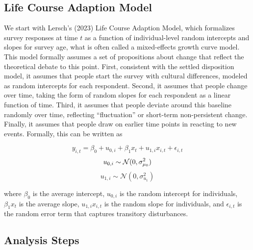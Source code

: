 \documentclass[
  12pt,
]{article}
\begin{document}
\hypertarget{life-course-adaption-model}{%
\subsection{Life Course Adaption
Model}\label{life-course-adaption-model}}

We start with Lersch's (2023) Life Course Adaption Model, which
formalizes survey responses at time \(t\) as a function of
individual-level random intercepts and slopes for survey age, what is
often called a mixed-effects growth curve model. This model formally
assumes a set of propositions about change that reflect the theoretical
debate to this point. First, consistent with the settled disposition
model, it assumes that people start the survey with cultural
differences, modeled as random intercepts for each respondent. Second,
it assumes that people change over time, taking the form of random
slopes for each respondent as a linear function of time. Third, it
assumes that people deviate around this baseline randomly over time,
reflecting ``fluctuation'' or short-term non-persistent change. Finally,
it assumes that people draw on earlier time points in reacting to new
events. Formally, this can be written as

\[
y_{i, t} = \beta_0 + u_{0, i} + \beta_{1} x_t + u_{1, i} x_{i, t} + \epsilon_{i, t}
\] \[
u_{0,i} \sim \mathcal{N}(0,\sigma_{\mu_0}^2) \\
\] \[
u_{1,i} \sim \mathcal{N}(0,\sigma_{u_1}^2)
\]

where \(\beta_0\) is the average intercept, \(u_{0, i}\) is the random
intercept for individuals, \(\beta_1 x_t\) is the average slope,
\(u_{1, i} x_{i, t}\) is the random slope for individuals, and
\(\epsilon_{i, t}\) is the random error term that captures transitory
disturbances.

\hypertarget{analysis-steps}{%
\subsection{Analysis Steps}\label{analysis-steps}}
\end{document}
